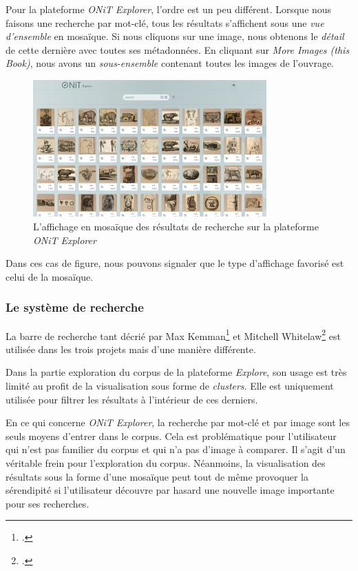 Pour la plateforme \textit{ONiT Explorer}, l'ordre est un peu différent. Lorsque nous faisons une recherche par mot-clé, tous les résultats s'affichent sous une \textit{vue d'ensemble} en mosaïque. Si nous cliquons sur une image, nous obtenons le \textit{détail} de cette dernière avec toutes ses métadonnées. En cliquant sur \textit{More Images (this Book)}, nous avons un \textit{sous-ensemble} contenant toutes les images de l'ouvrage.

\begin{figure}[H]
	\centering
	\includegraphics[width=0.8\textwidth]{images/onit_explorer_1.png}
	\caption{L'affichage en mosaïque des résultats de recherche sur la plateforme \textit{ONiT Explorer}}
	\label{fig:onit}
\end{figure}

Dans ces cas de figure, nous pouvons signaler que le type d'affichage favorisé est celui de la mosaïque. 

\subsubsection{Le système de recherche}

La barre de recherche tant décrié par Max Kemman\footcite{kemmanJustGoogleIt2014} et Mitchell Whitelaw\footcite{whitelawGenerousInterfacesDigital2015} est utilisée dans les trois projets mais d'une manière différente. 

Dans la partie exploration du corpus de la plateforme \textit{Explore}, son usage est très limité au profit de la visualisation sous forme de \textit{clusters}. Elle est uniquement utilisée pour filtrer les résultats à l'intérieur de ces derniers.

En ce qui concerne \textit{ONiT Explorer}, la recherche par mot-clé et par image sont les seuls moyens d'entrer dans le corpus. Cela est problématique pour l'utilisateur qui n'est pas familier du corpus et qui n'a pas d'image à comparer. Il s'agit d'un véritable frein pour l'exploration du corpus. Néanmoins, la visualisation des résultats sous la forme d'une mosaïque peut tout de même provoquer la sérendipité si l'utilisateur découvre par hasard une nouvelle image importante pour ses recherches.

